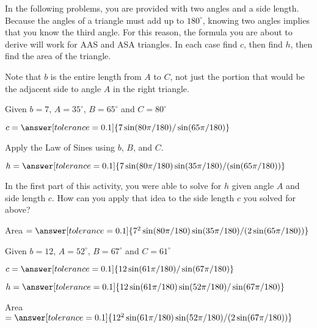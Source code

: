 \documentclass[number]{ximera}
\begin{document}
In the following problems, you are provided with two angles and a side length.
Because the angles of a triangle must add up to $180^\circ$, knowing two angles implies that you know the third angle.
For this reason, the formula you are about to derive will work for AAS and ASA triangles.
In each case find $c$, then find $h$, then find the area of the triangle.

 Note that $b$ is the entire length from $A$ to $C$, not just the portion that would be the adjacent side to angle $A$ in the right triangle.


\begin{problem}
Given $b = 7$, $A = 35^\circ$, $B = 65^\circ$ and $C = 80^\circ$
\begin{image}
\end{image}

$c=\answer[tolerance=0.1]{7\sin(80\pi/180)/\sin(65\pi/180)}$

\begin{hint}
Apply the Law of Sines using $b$, $B$, and $C$.
\end{hint}

$h=\answer[tolerance=0.1]{7\sin(80\pi/180)\sin(35\pi/180)/(\sin(65\pi/180))}$

\begin{hint}
In the first part of this activity, you were able to solve for $h$ given angle $A$ and side length $c$.
How can you apply that idea to the side length $c$ you solved for above?
\end{hint}

Area $= \answer[tolerance=0.1]{7^2\sin(80\pi/180)\sin(35\pi/180)/(2\sin(65\pi/180))}$
\end{problem} 

\begin{problem} 
Given $b = 12$, $A = 52^\circ$, $B = 67^\circ$ and $C = 61^\circ$

$c=\answer[tolerance=0.1]{12\sin(61\pi/180)/\sin(67\pi/180)}$

$h=\answer[tolerance=0.1]{12\sin(61\pi/180)\sin(52\pi/180)/\sin(67\pi/180)}$

Area $=\answer[tolerance=0.1]{12^2\sin(61\pi/180)\sin(52\pi/180)/(2\sin(67\pi/180))}$
\end{problem}
\end{document}
